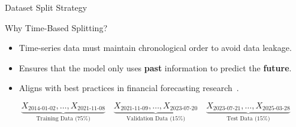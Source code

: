 \begin{frame}[label=datasetsplit, shrink]{Dataset Split Strategy}

\small

\begin{block}{Why Time-Based Splitting?}
\begin{itemize}
    \item Time-series data must maintain chronological order to avoid data leakage.
    \item Ensures that the model only uses \textbf{past} information to predict the \textbf{future}.
    \item Aligns with best practices in financial forecasting research~\parencite{chang2024StockPrediction, guo2024LSTMStock}.
\end{itemize}
\end{block}

\vspace{0.5em}
{\footnotesize
\begin{equation}
\label{eq:dataset_split_dates}
\underbrace{X_{\text{2014-01-02}}, \dots, X_{\text{2021-11-08}}}_{\text{Training Data (75\%)}} 
\quad
\underbrace{X_{\text{2021-11-09}}, \dots, X_{\text{2023-07-20}}}_{\text{Validation Data (15\%)}} 
\quad
\underbrace{X_{\text{2023-07-21}}, \dots, X_{\text{2025-03-28}}}_{\text{Test Data (15\%)}} 
\end{equation}
}
\end{frame}



